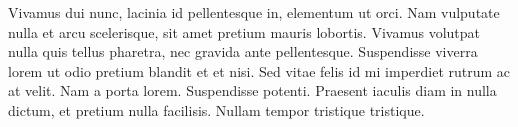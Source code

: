 Vivamus dui nunc, lacinia id pellentesque in, elementum ut orci. Nam vulputate nulla et arcu scelerisque, sit amet pretium mauris lobortis. Vivamus volutpat nulla quis tellus pharetra, nec gravida ante pellentesque. Suspendisse viverra lorem ut odio pretium blandit et et nisi. Sed vitae felis id mi imperdiet rutrum ac at velit. Nam a porta lorem. Suspendisse potenti. Praesent iaculis diam in nulla dictum, et pretium nulla facilisis. Nullam tempor tristique tristique.